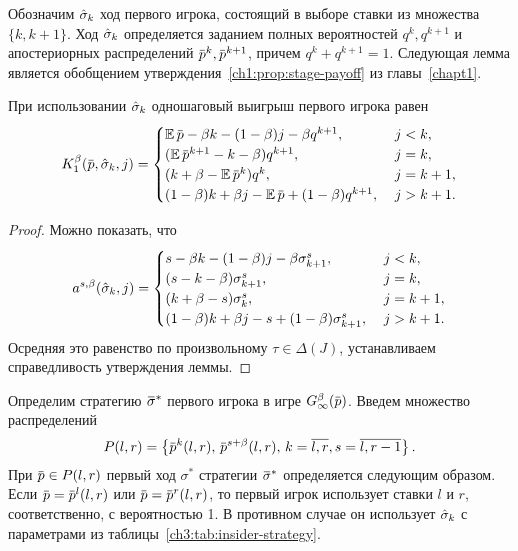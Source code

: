 {Обозначим $\hat{\sigma}_k$ ход первого игрока, состоящий в выборе ставки из множества $\{k, k+1\}$.
Ход $\hat{\sigma}_k$ определяется заданием полных вероятностей $q^k, q^{k+1}$ и апостериорных распределений $\p^k, \p^{k+1}$, причем $q^k + q^{k+1} = 1$.
Следующая лемма является обобщением утверждения~\ref{ch1:prop:stage-payoff} из главы~\ref{chapt1}.
\begin{lemma}
  \label{ch3:lower-bound:lemma:stage-payoff}
  При использовании $\hat{\sigma}_k$ одношаговый выигрыш первого игрока равен
  \begin{equation*}
    \K[1](\p, \sigmak_k, j) = \begin{cases}
      \E \p - \beta k - (1-\beta) j - \beta q^{k+1}, &\; j < k, \\
      (\E \p^{k+1} - k - \beta) q^{k+1}, &\; j = k, \\
      (k + \beta - \E \p^k) q^k, &\; j = k+1, \\
      (1-\beta) k + \beta j - \E \p + (1-\beta) q^{k+1}, &\; j > k + 1.
    \end{cases}
  \end{equation*}
\end{lemma}
\begin{proof}
  Можно показать, что
  \begin{equation*}
    a^{s,\beta}(\hat{\sigma}_k, j) = \begin{cases}
      s - \beta k - (1-\beta) j - \beta \sigma^s_{k+1},     & \; j < k,   \\
      (s - k - \beta) \sigma^s_{k+1},                       & \; j = k,   \\
      (k + \beta - s) \sigma^s_k,                           & \; j = k+1, \\
      (1-\beta) k + \beta j - s + (1-\beta) \sigma^s_{k+1}, & \; j > k + 1.
    \end{cases}
  \end{equation*}
  Осредняя это равенство по произвольному $\tau \in \Delta(J)$, устанавливаем справедливость утверждения леммы.
\end{proof}

Определим стратегию $\sigmav^*$ первого игрока в игре $\theG[\infty](\p)$.
Введем множество распределений
\begin{equation*}
  P(l,r) = \left\{
    \p^k(l, r), \, \p^{s+\beta}(l, r), \, k = \overline{l,r}, s = \overline{l,r-1}
  \right\}.
\end{equation*}
При $\p \in P(l,r)$ первый ход $\sigma^*$ стратегии $\sigmav^*$ определяется следующим образом.
Если $\p = \p^l(l,r)$ или $\p = \p^r(l,r)$, то первый игрок использует ставки $l$ и $r$, соответственно, с вероятностью 1.
В противном случае он использует $\hat{\sigma}_k$ с параметрами из таблицы~\ref{ch3:tab:insider-strategy}.

}
